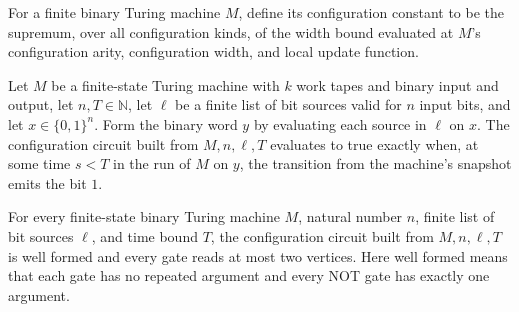 \begin{definition}
\label{Complexity.cfgConst}
\leanok
{}
For a finite binary Turing machine $M$, define its configuration constant to be the
supremum, over all configuration kinds, of the width bound evaluated at $M$’s
configuration arity, configuration width, and local update function.
\end{definition}

\begin{theorem}
\label{Complexity.cfgCircuit_eval}
\leanok
{}
Let $M$ be a finite-state Turing machine with $k$ work tapes and binary input and
output, let $n,T\in\mathbb{N}$, let $\ell$ be a finite list of bit sources valid for $n$
input bits, and let $x\in\{0,1\}^n$. Form the binary word $y$ by evaluating each source
in $\ell$ on $x$. The configuration circuit built from $M, n,\ell,T$ evaluates to true
exactly when, at some time $s<T$ in the run of $M$ on $y$, the transition from the
machine's snapshot emits the bit $1$.
\end{theorem}

\begin{theorem}
\label{Complexity.cfgCircuit_isFaninTwo}
\leanok
{}
For every finite-state binary Turing machine $M$, natural number $n$, finite list of bit
sources $\ell$, and time bound $T$, the configuration circuit built from $M,n,\ell,T$ is
well formed and every gate reads at most two vertices. Here well formed means that each
gate has no repeated argument and every NOT gate has exactly one argument.
\end{theorem}

